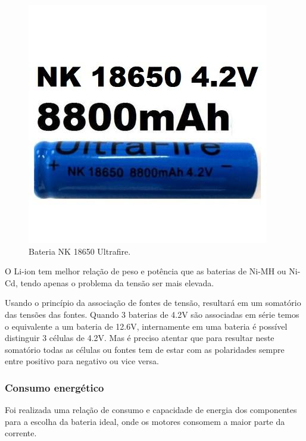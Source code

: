 		\begin{figure}[H]
			\centering
			\includegraphics[scale=0.7]{figuras/bateria.jpg}
			\caption{Bateria NK 18650 Ultrafire.}
			\label{img:bateria}
		\end{figure}

		O Li-ion tem melhor relação de peso e potência que as baterias de Ni-MH ou Ni-Cd, tendo apenas o problema da tensão ser mais elevada.

		Usando o princípio da associação de fontes de tensão, resultará em um somatório das tensões das fontes. Quando 3 baterias de 4.2V são associadas em série temos o equivalente a um bateria de 12.6V, internamente em uma bateria é possível distinguir 3 células de 4.2V. Mas é preciso atentar que para resultar neste somatório todas as células ou fontes tem de estar com as polaridades sempre entre positivo para negativo ou vice versa.

	\subsubsection{Consumo energético}

		Foi realizada uma relação de consumo e capacidade de energia dos componentes para a escolha da bateria ideal, onde os motores consomem a maior parte da corrente.

